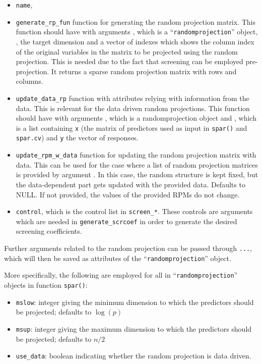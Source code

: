 \documentclass[
  article]{jss}
\begin{document}
\begin{itemize}
\item
  \texttt{name},
\item
  \texttt{generate\_rp\_fun} function for generating the random
  projection matrix. This function should have with arguments ,
  which is a ``\texttt{randomprojection}'' object, , the target
  dimension and a vector of indexes  which shows
  the column index of the original variables in the  matrix to
  be projected using the random projection. This is needed due to the
  fact that screening can be employed pre-projection. It returns a
  sparse random projection matrix with  rows and
   columns.
\item
  \texttt{update\_data\_rp} function with attributes relying with
  information from the data. This is relevant for the data driven random
  projections. This function should have with arguments , which
  is a randomprojection object and , which is a list
  containing \texttt{x} (the matrix of predictors used as input in
  \texttt{spar()} and \texttt{spar.cv}) and \texttt{y} the vector of
  responses.
\item
  \texttt{update\_rpm\_w\_data} function for updating the random
  projection matrix with data. This can be used for the case where a
  list of random projection matrices is provided by argument
  . In this case, the random structure is kept fixed, but the
  data-dependent part gets updated with the provided data. Defaults to
  NULL. If not provided, the values of the provided RPMs do not change.
\item
  \texttt{control}, which is the control list in \texttt{screen\_*}.
  These controls are arguments which are needed in
  \texttt{generate\_scrcoef} in order to generate the desired screening
  coefficients.
\end{itemize}

Further arguments related to the random projection can be passed through
\texttt{...}, which will then be saved as attributes of the
``\texttt{randomprojection}'' object.

More specifically, the following are employed for all in
``\texttt{randomprojection}'' objects in function \texttt{spar()}:

\begin{itemize}
\item
  \texttt{mslow}: integer giving the minimum dimension to which the
  predictors should be projected; defaults to \(\log(p)\)
\item
  \texttt{msup}: integer giving the maximum dimension to which the
  predictors should be projected; defaults to \(n/2\)
\item
  \texttt{use\_data}: boolean indicating whether the random projection
  is data driven.
\end{itemize}
\end{document}
